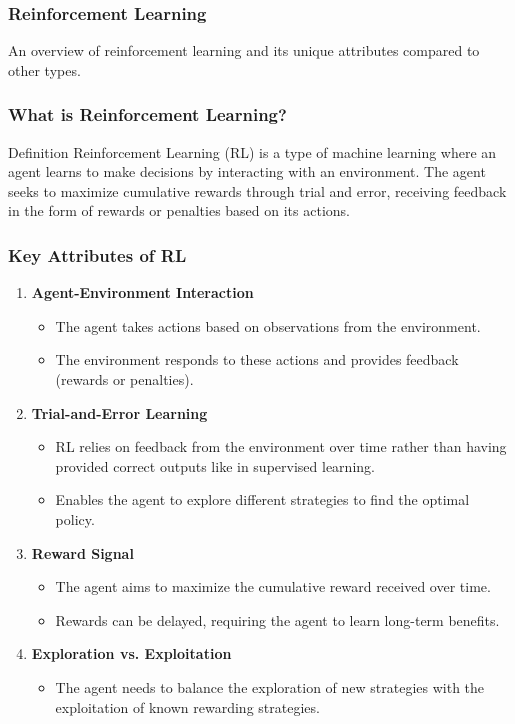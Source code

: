 \documentclass[aspectratio=169]{beamer}
\begin{document}
\begin{frame}[fragile]
    \frametitle{Reinforcement Learning}
    An overview of reinforcement learning and its unique attributes compared to other types.
\end{frame}

\begin{frame}[fragile]
    \frametitle{What is Reinforcement Learning?}
    \begin{block}{Definition}
        Reinforcement Learning (RL) is a type of machine learning where an agent learns to make decisions by interacting with an environment. The agent seeks to maximize cumulative rewards through trial and error, receiving feedback in the form of rewards or penalties based on its actions.
    \end{block}
\end{frame}

\begin{frame}[fragile]
    \frametitle{Key Attributes of RL}
    \begin{enumerate}
        \item \textbf{Agent-Environment Interaction}
            \begin{itemize}
                \item The agent takes actions based on observations from the environment.
                \item The environment responds to these actions and provides feedback (rewards or penalties).
            \end{itemize}
            
        \item \textbf{Trial-and-Error Learning}
            \begin{itemize}
                \item RL relies on feedback from the environment over time rather than having provided correct outputs like in supervised learning.
                \item Enables the agent to explore different strategies to find the optimal policy.
            \end{itemize}

        \item \textbf{Reward Signal}
            \begin{itemize}
                \item The agent aims to maximize the cumulative reward received over time.
                \item Rewards can be delayed, requiring the agent to learn long-term benefits.
            \end{itemize}

        \item \textbf{Exploration vs. Exploitation}
            \begin{itemize}
                \item The agent needs to balance the exploration of new strategies with the exploitation of known rewarding strategies.
            \end{itemize}
    \end{enumerate}
\end{frame}
\end{document}
